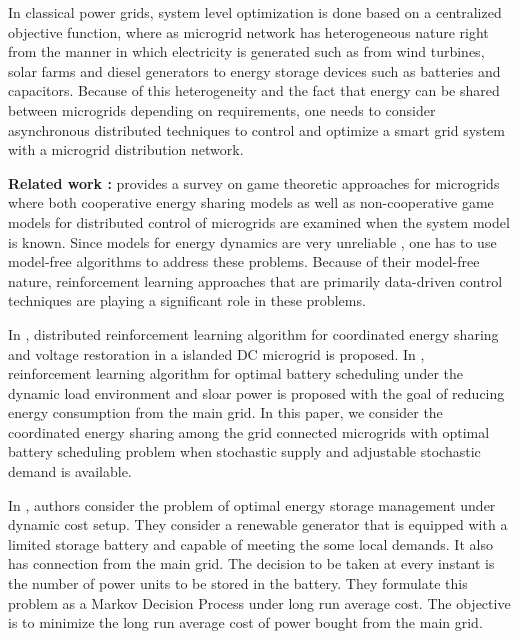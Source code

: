  In classical power grids, system level optimization is done based on a centralized
objective function, where as 
microgrid network has heterogeneous nature right from the manner in which electricity
is generated such as from wind turbines, solar farms and diesel generators
to energy storage devices such as batteries and capacitors.
 Because of this heterogeneity and the fact that energy can be shared between microgrids depending
on requirements, one needs to consider asynchronous distributed techniques 
 to control and optimize a smart grid system
with a microgrid distribution network.



\textbf{Related work :} \cite{saad2012game} provides a survey on game theoretic approaches for microgrids where both cooperative energy sharing models as well as non-cooperative game models for distributed control of microgrids are examined when the system model is known. Since  models for energy dynamics are very unreliable \cite{zamora2010controls}, one has to use model-free algorithms to address these problems.  Because of their model-free nature, reinforcement learning \cite{sutton1998reinforcement} approaches that are primarily data-driven control techniques are playing a significant role in these problems.

In \cite{zifadistributed}, distributed reinforcement learning algorithm for coordinated energy sharing and voltage restoration in a islanded DC microgrid is proposed. In \cite{leo2014reinforcement}, reinforcement learning algorithm for optimal battery scheduling under the dynamic load environment and sloar power is proposed with the goal of  reducing  energy consumption from the main grid. In this paper, we  consider the coordinated energy sharing among the grid connected microgrids with optimal battery scheduling problem when stochastic supply and adjustable stochastic demand is available.

In \cite{pharsha}, authors consider the problem of optimal energy storage management under dynamic cost setup. They consider a renewable generator that is equipped with a limited storage battery and capable of meeting the some local demands. It also has connection from the main grid. The decision to be taken at every instant is the number of power units to be stored in the battery. They formulate this problem as a Markov Decision Process under long run average cost. The objective is to minimize the long run average cost of power bought from the main grid.


